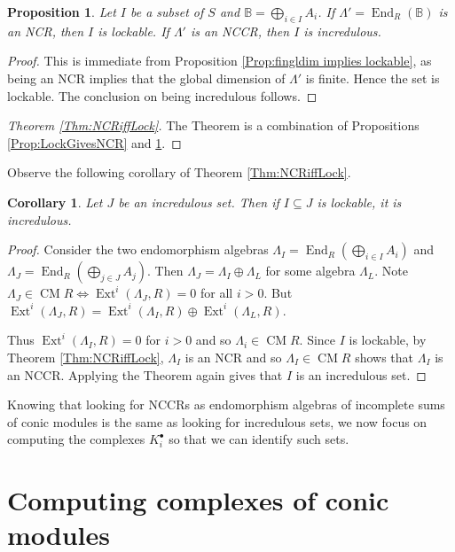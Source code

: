 \documentclass[reqno, 12pt]{amsart}
\newtheorem{proposition}[theorem]{Proposition}
\newtheorem{corollary}[theorem]{Corollary}
\theoremstyle{definition}
\numberwithin{equation}{section}
\newcommand{\End}{\operatorname{End}}
\newcommand{\Ext}{\operatorname{Ext}}
\begin{document}
\begin{proposition}
    \label{Prop:NCRgivesLock}
    Let $I$ be a subset of $S$ and $\mathbb{B}=\bigoplus_{i\in I}A_i$. If $\Lambda'=\End_R(\mathbb{B})$ is an NCR, then $I$ is lockable. If $\Lambda'$ is an NCCR, then $I$ is incredulous.
\end{proposition}

\begin{proof}
This is immediate from Proposition \ref{Prop:fingldim implies lockable}, as being an NCR implies that the global dimension of $\Lambda'$ is finite. Hence the set is lockable. The conclusion on being incredulous follows. 
\end{proof}

\begin{proof}[Theorem \ref{Thm:NCRiffLock}]
    The Theorem is a combination of Propositions \ref{Prop:LockGivesNCR} and \ref{Prop:NCRgivesLock}.
\end{proof}

Observe the following corollary of Theorem \ref{Thm:NCRiffLock}.

\begin{corollary}
\label{Cor:SubsetOFIncr}
Let $J$ be an incredulous set. Then if $I\subseteq J$ is lockable, it is incredulous. 
\end{corollary}
\begin{proof}
    Consider the two endomorphism algebras $\Lambda_I=\End_R(\bigoplus_{i\in I}A_i)$ and $\Lambda_J=\End_R(\bigoplus_{j\in J}A_j)$. Then $\Lambda_J=\Lambda_I\oplus \Lambda_L$ for some algebra $\Lambda_L$. Note $\Lambda_J\in \operatorname{CM}R\Leftrightarrow \Ext^i(\Lambda_J,R)=0$ for all $i>0$. But $\Ext^i(\Lambda_J,R)=\Ext^i(\Lambda_I,R)\oplus \Ext^i(\Lambda_L,R)$. 

    Thus $\Ext^i(\Lambda_I,R)=0$ for $i>0$ and so $\Lambda_i\in \operatorname{CM}R$. Since $I$ is lockable, by Theorem \ref{Thm:NCRiffLock}, $\Lambda_I$ is an NCR and so $\Lambda_I\in \operatorname{CM}R$ shows that $\Lambda_I$ is an NCCR. Applying the Theorem again gives that $I$ is an incredulous set.
\end{proof}

Knowing that looking for NCCRs as endomorphism algebras of incomplete sums of conic modules is the same as looking for incredulous sets, we now focus on computing the complexes $K_i^\bullet$ so that we can identify such sets.

\section{Computing complexes of conic modules}\label{sec:Compute}
\end{document}
